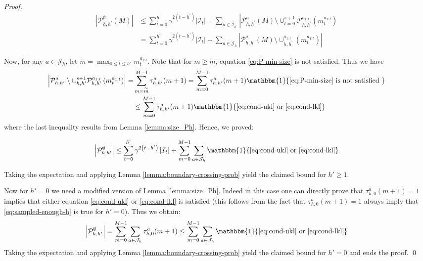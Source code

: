 \documentclass[runningheads, envcountsame, a4paper]{llncs}
\begin{document}
\begin{proof}
\begin{equation*}
\begin{aligned}\left|\mathcal{P}_{h, h^{\prime}}^{\emptyset}(M)\right| & \leq \sum_{t=0}^{h^{\prime}} \gamma^{2\left(t-h^{\prime}\right)}\left|\mathcal{I}_{t}\right|+\sum_{a \in \mathcal{I}_{h^{\prime}}}\left|\mathcal{P}_{h, h^{\prime}}^{a}(M) \setminus \cup_{t=0}^{s+1} \mathcal{P}_{h, h^{\prime}}^{a_{1 : t}}\left(m_{t}^{a_{1 : t}}\right)\right.\\ &=\sum_{t=0}^{h^{\prime}} \gamma^{2\left(t-h^{\prime}\right)}\left|\mathcal{I}_{t}\right|+\sum_{a \in \mathcal{J}_{h}}\left|\mathcal{P}_{h, h^{\prime}}^{a}(M) \setminus \cup_{h, h^{\prime}}^{a_{1 : t}}\left(m_{t}^{a_{1 : t}}\right)\right| \end{aligned}
\end{equation*}

Now, for any $a\in \mathcal{J}_h$, let $\tilde{m} = \max_{0\leq t\leq h'} m_t^{a_{1:t}}$. Note that for $m\geq \tilde{m}$, equation \eqref{eq:P-min-size} is not satisfied. Thus we have
\begin{equation*}
\begin{aligned}
\left|\mathcal{P}_{h, h^{\prime}}^{a} \setminus \cup_{h, h^{\prime}}^{s+1} \mathcal{P}_{h, h^{\prime}}^{a_{1 : t}}\left(m_{t}^{a_{1 : t}}\right)\right|=&\sum_{m=\tilde{m}}^{M-1} \tau_{h, h^{\prime}}^{a}(m+1)=\sum_{m=0}^{M-1} \tau_{h, h^{\prime}}^{a}(m+1) \mathbbm{1}\{\eqref{eq:P-min-size} \text { is not satisfied }\} \\ & \leq \sum_{m=0}^{M-1} \tau_{h, h^{\prime}}^{a}(m+1) \mathbbm{1}\{\eqref{eq:cond-ukl} \text { or }\eqref{eq:cond-lkl}\} \end{aligned}
\end{equation*}
where the last inequality results from Lemma \ref{lemma:size_Ph}. Hence, we proved:

\begin{equation*}
\left|\mathcal{P}_{h, h^{\prime}}^{\emptyset}\right| \leq \sum_{t=0}^{h^{\prime}} \gamma^{2\left(t-h^{\prime}\right)}\left|\mathcal{I}_{t}\right|+\sum_{m=0}^{M-1} \sum_{a \in \mathcal{J}_{h}} \mathbbm{1}\{\eqref{eq:cond-ukl}\text{ or }\eqref{eq:cond-lkl}\}
\end{equation*}

Taking the expectation and applying Lemma \ref{lemma:boundary-crossing-prob} yield the claimed bound for $h'\geq 1$.

Now for $h' = 0$ we need a modified version of Lemma \ref{lemma:size_Ph}. Indeed in this case one can directly prove that $\tau_{h,0}^a(m+1)=1$ implies that either equation \eqref{eq:cond-ukl} or \eqref{eq:cond-lkl} is satisfied (this follows from the fact that $\tau_{h,0}^a(m+1)=1$ always imply that \eqref{eq:sampled-enough-h} is true for $h'= 0$). Thus we obtain:
\begin{equation*}
\left|\mathcal{P}_{h, h^{\prime}}^{\emptyset}\right|=\sum_{m=0}^{M-1} \sum_{a \in \mathcal{J}_{h}} \tau_{h, 0}^{a}(m+1) \leq \sum_{m=0}^{M-1} \sum_{a \in \mathcal{J}_{h}} \mathbbm{1}\{\eqref{eq:cond-ukl}\text{ or }\eqref{eq:cond-lkl}\}
\end{equation*}
Taking the expectation and applying Lemma \ref{lemma:boundary-crossing-prob} yield the claimed bound for $h' = 0$ and ends the proof.
\qed
\end{proof}
\end{document}
